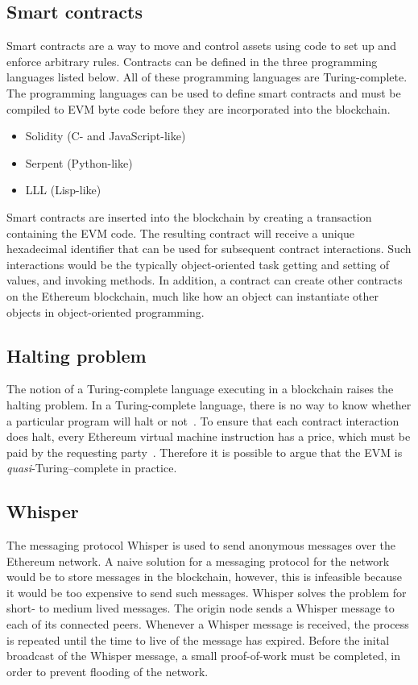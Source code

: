 \subsection{Smart contracts}
\label{sec:tech:contracts}
Smart contracts are a way to move and control assets using code to set up and enforce arbitrary rules. Contracts can be defined in the three programming languages listed below. All of these programming languages are Turing-complete. The programming languages can be used to define smart contracts and must be compiled to EVM byte code before they are incorporated into the blockchain.

\begin{itemize}
    \item Solidity (C- and JavaScript-like)
    \item Serpent (Python-like)
    \item LLL (Lisp-like)
\end{itemize}

Smart contracts are inserted into the blockchain by creating a transaction containing the EVM code. The resulting contract will receive a unique hexadecimal identifier that can be used for subsequent contract interactions. Such interactions would be the typically object-oriented task getting and setting of values, and invoking methods. In addition, a contract can create other contracts on the Ethereum blockchain, much like how an object can instantiate other objects in object-oriented programming.

\subsection{Halting problem}
\label{sec:tech:halting}
The notion of a Turing-complete language executing in a blockchain raises the halting problem. In a Turing-complete language, there is no way to know whether a particular program will halt or not~\cite{hopcroft}. To ensure that each contract interaction does halt, every Ethereum virtual machine instruction has a price, which must be paid by the requesting party~\cite{ethereum:yellow}. Therefore it is possible to argue that the EVM is \emph{quasi}-Turing--complete in practice.

\subsection{Whisper}
The messaging protocol Whisper is used to send anonymous messages over the Ethereum network. A naive solution for a messaging protocol for the network would be to store messages in the blockchain, however, this is infeasible because it would be too expensive to send such messages. Whisper solves the problem for short- to medium lived messages. The origin node sends a Whisper message to each of its connected peers. Whenever a Whisper message is received, the process is repeated until the time to live of the message has expired. Before the inital broadcast of the Whisper message, a small proof-of-work must be completed, in order to prevent flooding of the network.

